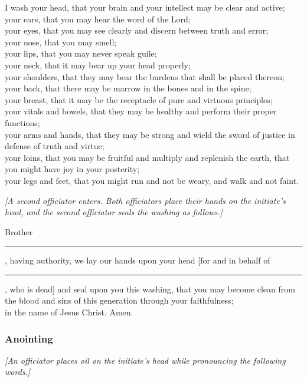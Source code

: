 			\noindent I wash your head, that your brain and your intellect may be clear and active;\\
			your ears, that you may hear the word of the Lord;\\
			your eyes, that you may see clearly and discern between truth and error;\\
			your nose, that you may smell;\\
			your lips, that you may never speak guile;\\
			your neck, that it may bear up your head properly;\\
			your shoulders, that they may bear the burdens that shall be placed thereon;\\
			your back, that there may be marrow in the bones and in the spine;\\
			your breast, that it may be the receptacle of pure and virtuous principles;\\
			your vitals and bowels, that they may be healthy and perform their proper functions;\\
			your arms and hands, that they may be strong and wield the sword of justice in defense of truth and virtue;\\
			your loins, that you may be fruitful and multiply and replenish the earth, that you might have joy in your posterity;\\
			your legs and feet, that you might run and not be weary, and walk and not faint.
			
			\textit{[A second officiator enters. Both officiators place their hands on the initiate's head, and the second officiator seals the washing as follows.]}
			
			Brother \rule{1cm}{0.15mm}, having authority, we lay our hands upon your head [for and in behalf of \rule{1cm}{0.15mm}, who is dead] and seal upon you this washing, that you may become clean from the blood and sins of this generation through your faithfulness;\\ in the name of Jesus Christ. Amen.
			
		\subsubsection{Anointing}
			\label{TEMPLE-ENDOWMENT-INIT-PRE-2005-ANOINT}
		
			\textit{[An officiator places oil on the initiate's head while pronouncing the following words.]}
			
